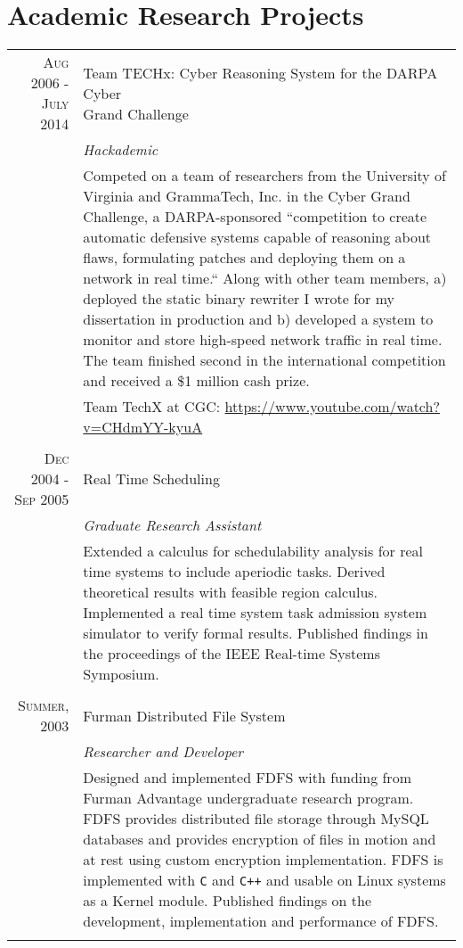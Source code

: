 \documentclass[a4paper,10pt]{article} %
\begin{document}
\section{Academic Research Projects}
\begin{tabular}{r|p{11cm}}

\textsc{Aug 2006 - July 2014} & \makecell[tl]{Team TECHx: Cyber Reasoning System for the DARPA Cyber \\ Grand Challenge} \\
& \emph{Hackademic} \\
& \footnotesize{Competed on a team of researchers from the University of Virginia and GrammaTech, Inc. in the Cyber Grand Challenge, a DARPA-sponsored ``competition to create automatic defensive systems capable of reasoning about flaws, formulating patches and deploying them on a network in real time.`` Along with other team members, a) deployed the static binary rewriter I wrote for my dissertation in production and b) developed a system to monitor and store high-speed network traffic in real time. The team finished second in the international competition and received a \$1 million cash prize.} \\
& Team TechX at CGC: \url{https://www.youtube.com/watch?v=CHdmYY-kyuA} \\
\multicolumn{2}{c}{} \\

\textsc{Dec 2004 - Sep 2005} & Real Time Scheduling \\
& \emph{Graduate Research Assistant} \\
& \footnotesize{Extended a calculus for schedulability analysis for real time systems to include aperiodic tasks. Derived theoretical results with feasible region calculus. Implemented a real time system task admission system simulator to verify formal results. Published findings in the proceedings of the IEEE Real-time Systems Symposium.} \\
\multicolumn{2}{c}{} \\

\textsc{Summer, 2003} & Furman Distributed File System \\
& \emph{Researcher and Developer} \\
& \footnotesize{Designed and implemented FDFS with funding from Furman Advantage undergraduate research program. FDFS provides distributed file storage through MySQL databases and provides encryption of files in motion and at rest using custom encryption implementation. FDFS is implemented with \texttt{C} and \texttt{C++} and usable on Linux systems as a Kernel module. Published findings on the development, implementation and performance of FDFS.} \\
\multicolumn{2}{c}{} \\


\end{tabular}
\end{document}
